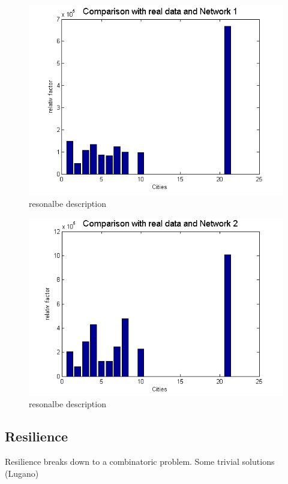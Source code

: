\documentclass[11pt]{article}
\begin{document}
\begin{figure}
\includegraphics[scale=0.5]{compare1}
 \caption{resonalbe description}
\end{figure}

\begin{figure}
\includegraphics[scale=0.5]{compare2}
 \caption{resonalbe description}
\end{figure}



\subsection{Resilience}


 Resilience breaks down to a combinatoric problem. Some trivial solutions (Lugano)
 
\end{document}
